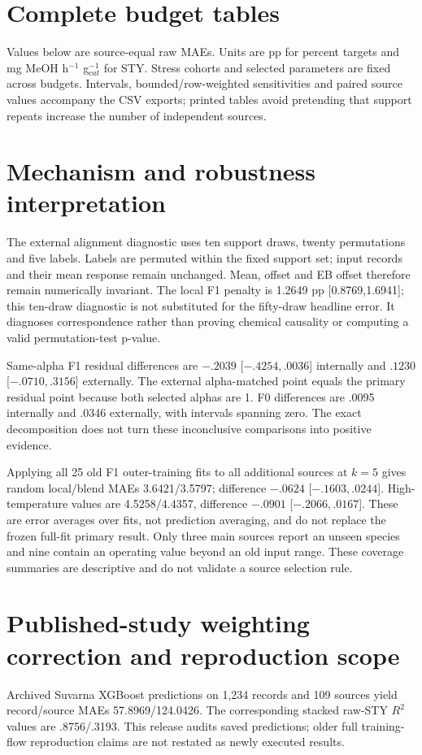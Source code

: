 \documentclass[11pt]{article}
\begin{document}
\section{Complete budget tables}
Values below are source-equal raw MAEs. Units are pp for percent targets and mg MeOH h$^{-1}$ g$_{cat}^{-1}$ for STY. Stress cohorts and selected parameters are fixed across budgets. Intervals, bounded/row-weighted sensitivities and paired source values accompany the CSV exports; printed tables avoid pretending that support repeats increase the number of independent sources.


\section{Mechanism and robustness interpretation}
The external alignment diagnostic uses ten support draws, twenty permutations and five labels. Labels are permuted within the fixed support set; input records and their mean response remain unchanged. Mean, offset and EB offset therefore remain numerically invariant. The local F1 penalty is 1.2649 pp [0.8769,1.6941]; this ten-draw diagnostic is not substituted for the fifty-draw headline error. It diagnoses correspondence rather than proving chemical causality or computing a valid permutation-test p-value.

Same-alpha F1 residual differences are $-.2039$ [$-.4254,.0036$] internally and $.1230$ [$-.0710,.3156$] externally. The external alpha-matched point equals the primary residual point because both selected alphas are 1. F0 differences are .0095 internally and .0346 externally, with intervals spanning zero. The exact decomposition does not turn these inconclusive comparisons into positive evidence.

Applying all 25 old F1 outer-training fits to all additional sources at $k=5$ gives random local/blend MAEs 3.6421/3.5797; difference $-.0624$ [$-.1603,.0244$]. High-temperature values are 4.5258/4.4357, difference $-.0901$ [$-.2066,.0167$]. These are error averages over fits, not prediction averaging, and do not replace the frozen full-fit primary result. Only three main sources report an unseen species and nine contain an operating value beyond an old input range. These coverage summaries are descriptive and do not validate a source selection rule.

\section{Published-study weighting correction and reproduction scope}
Archived Suvarna XGBoost predictions on 1,234 records and 109 sources yield record/source MAEs 57.8969/124.0426. The corresponding stacked raw-STY $R^2$ values are .8756/.3193. This release audits saved predictions; older full training-flow reproduction claims are not restated as newly executed results.
\end{document}
